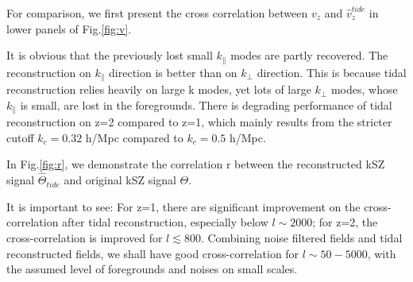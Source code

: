 \label{ssec:tide}
For comparison, we first present the cross correlation between $v_z$ and $\hat v_z^{tide}$ in lower panels of Fig.\ref{fig:v}. 

It is obvious that the previously lost small $k_\parallel$ modes are partly recovered. 
The reconstruction on $k_\parallel$ direction is better than on $k_\perp$ direction.
This is because tidal reconstruction relies heavily on large k modes, 
yet lots of large $k_\perp$ modes, whose $k_\parallel$ is small, are lost in the foregrounds. 
There is degrading performance of tidal reconstruction on z=2 compared to z=1, 
which mainly results from the stricter cutoff $k_c=0.32$ h/Mpc compared to $k_c=0.5$ h/Mpc.

In Fig.\ref{fig:r}, 
we demonstrate the correlation r between the reconstructed kSZ signal $\hat \Theta_{tide}$ and original kSZ signal $\Theta$. 

It is important to see:
For z=1, there are significant improvement on the cross-correlation after tidal reconstruction, especially below $l\sim 2000$; 
for z=2, the cross-correlation is improved for $l\lesssim 800$. 
Combining noise filtered fields and tidal reconstructed fields, we shall have good cross-correlation for $l \sim 50-5000$, 
with the assumed level of foregrounds and noises on small scales.


